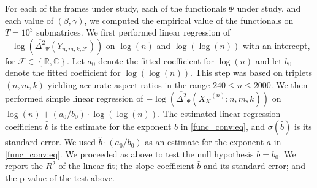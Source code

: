 \documentclass[a4paper,12pt]{article}
\newcommand{\V}[1]{\ensuremath{\mathbf{#1}}}
\newcommand{\R}{\ensuremath{\mathbb{R}}}
\newcommand{\C}{\ensuremath{\mathbb{C}}}
\newcommand{\Fc}{\ensuremath{\mathcal{F}}}
\newcommand{\m}{m}
\newcommand{\specstat}{\ensuremath{\Psi}}
\newcommand{\Xk}{\ensuremath{X_K}}
\begin{document}
For each of the frames under study, each of the functionals $\specstat$ 
under study, and 
each value of $(\beta,\gamma)$, we computed the empirical value of the
functionals on $T=10^3$ submatrices.
We first performed linear regression
%
%
of 
$-\log\left( \overline{\Delta^2}_{\specstat}(Y_{n,\m,k,\Fc})\right)$
on $\log(n)$ and $\log(\log(n))$ with an intercept, for $\Fc\in\left\{ \R,\C
\right\}$. 
Let $a_0$ denote the fitted coefficient for $\log(n)$ and let $b_0$ denote the
fitted coefficient for $\log(\log(n))$. 
This step was based on triplets $(n,m,k)$ yielding accurate aspect ratios in
the range $240\le n\le 2000$.
We then performed simple linear regression
of 
$-\log\left( \overline{\Delta^2}_{\specstat}(\Xk^{(n)};n,\m,k)\right)$
on 
$\log(n) + (a_0/b_0)\cdot \log(\log(n))$.
The estimated linear regression coefficient $\hat{b}$
is the estimate 
for the exponent $b$ in \eqref{func_conv:eq}, 
and $\sigma(\hat{b})$
is its standard error. We used 
$\hat{b}\cdot(a_0/b_0)$ as an
estimate for the exponent $a$ in
\eqref{func_conv:eq}.
We proceeded as above to test the null hypothesis $b=b_0$.
We report the $R^2$ of
the linear fit; the slope coefficient $\hat{b}$ and its standard error; and the
p-value of the test above.
\end{document}
